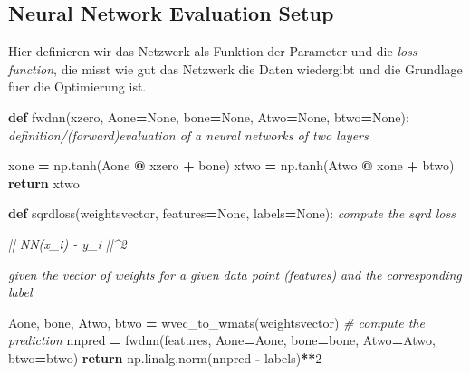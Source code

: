\documentclass[
]{book}
\newenvironment{Shaded}{\begin{snugshade}}{\end{snugshade}}
\newcommand{\CommentTok}[1]{\textcolor[rgb]{0.56,0.35,0.01}{\textit{#1}}}
\newcommand{\ControlFlowTok}[1]{\textcolor[rgb]{0.13,0.29,0.53}{\textbf{#1}}}
\newcommand{\DecValTok}[1]{\textcolor[rgb]{0.00,0.00,0.81}{#1}}
\newcommand{\KeywordTok}[1]{\textcolor[rgb]{0.13,0.29,0.53}{\textbf{#1}}}
\newcommand{\NormalTok}[1]{#1}
\newcommand{\OperatorTok}[1]{\textcolor[rgb]{0.81,0.36,0.00}{\textbf{#1}}}
\newcommand{\VariableTok}[1]{\textcolor[rgb]{0.00,0.00,0.00}{#1}}
\theoremstyle{definition}
\theoremstyle{definition}
\theoremstyle{definition}
\theoremstyle{definition}
\theoremstyle{remark}
\begin{document}
\hypertarget{neural-network-evaluation-setup}{%
\subsection{Neural Network Evaluation Setup}\label{neural-network-evaluation-setup}}

Hier definieren wir das Netzwerk als Funktion der Parameter und die \emph{loss function}, die misst wie gut das Netzwerk die Daten wiedergibt und die Grundlage fuer die Optimierung ist.

\begin{Shaded}
\begin{Highlighting}[]
\KeywordTok{def}\NormalTok{ fwdnn(xzero, Aone}\OperatorTok{=}\VariableTok{None}\NormalTok{, bone}\OperatorTok{=}\VariableTok{None}\NormalTok{, Atwo}\OperatorTok{=}\VariableTok{None}\NormalTok{, btwo}\OperatorTok{=}\VariableTok{None}\NormalTok{):}
    \CommentTok{\textquotesingle{}\textquotesingle{}\textquotesingle{} definition/(forward)evaluation of a neural networks of two layers}

\CommentTok{    \textquotesingle{}\textquotesingle{}\textquotesingle{}}
\NormalTok{    xone }\OperatorTok{=}\NormalTok{ np.tanh(Aone }\OperatorTok{@}\NormalTok{ xzero }\OperatorTok{+}\NormalTok{ bone)}
\NormalTok{    xtwo }\OperatorTok{=}\NormalTok{ np.tanh(Atwo }\OperatorTok{@}\NormalTok{ xone }\OperatorTok{+}\NormalTok{ btwo)}
    \ControlFlowTok{return}\NormalTok{ xtwo}
\end{Highlighting}
\end{Shaded}

\begin{Shaded}
\begin{Highlighting}[]
\KeywordTok{def}\NormalTok{ sqrdloss(weightsvector, features}\OperatorTok{=}\VariableTok{None}\NormalTok{, labels}\OperatorTok{=}\VariableTok{None}\NormalTok{):}
    \CommentTok{\textquotesingle{}\textquotesingle{}\textquotesingle{} compute the sqrd \textasciigrave{}loss\textasciigrave{}}

\CommentTok{    || NN(x\_i) {-} y\_i ||\^{}2}

\CommentTok{    given the vector of weights for a given data point (features)}
\CommentTok{    and the corresponding label}
\CommentTok{    \textquotesingle{}\textquotesingle{}\textquotesingle{}}

\NormalTok{    Aone, bone, Atwo, btwo }\OperatorTok{=}\NormalTok{ wvec\_to\_wmats(weightsvector)}
    \CommentTok{\# compute the prediction}
\NormalTok{    nnpred }\OperatorTok{=}\NormalTok{ fwdnn(features, Aone}\OperatorTok{=}\NormalTok{Aone, bone}\OperatorTok{=}\NormalTok{bone, Atwo}\OperatorTok{=}\NormalTok{Atwo, btwo}\OperatorTok{=}\NormalTok{btwo)}
    \ControlFlowTok{return}\NormalTok{ np.linalg.norm(nnpred }\OperatorTok{{-}}\NormalTok{ labels)}\OperatorTok{**}\DecValTok{2}
\end{Highlighting}
\end{Shaded}
\end{document}
